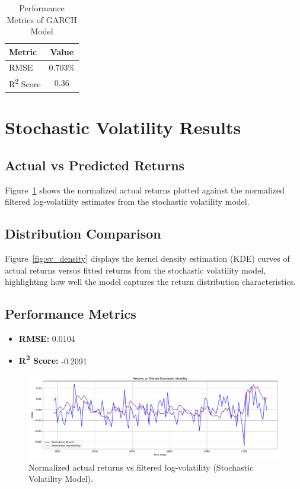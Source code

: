 \begin{table}[h!]
\centering
\caption{Performance Metrics of GARCH Model}
\label{tab:garch_performance}
\begin{tabular}{|l|c|}
\hline
\textbf{Metric}   & \textbf{Value}  \\ \hline
RMSE              & 0.703\%  \\ \hline
R\textsuperscript{2} Score & 0.36  \\ \hline
\end{tabular}
\end{table}

\newpage
\section{Stochastic Volatility Results}
\subsection{Actual vs Predicted Returns}
Figure~\ref{fig:sv_actual_vs_pred} shows the normalized actual returns plotted against the normalized filtered log-volatility estimates from the stochastic volatility model.

\subsection{Distribution Comparison}
Figure~\ref{fig:sv_density} displays the kernel density estimation (KDE) curves of actual returns versus fitted returns from the stochastic volatility model, highlighting how well the model captures the return distribution characteristics.

\subsection{Performance Metrics}
\begin{itemize}
    \item \textbf{RMSE:} 0.0104
    \item \textbf{R\textsuperscript{2} Score:} -0.2091
\end{itemize}

\begin{figure}[h!]
    \centering
    \includegraphics[width=\textwidth]{Images/stochastic_volatility.pdf}
    \caption{Normalized actual returns vs filtered log-volatility (Stochastic Volatility Model).}
    \label{fig:sv_actual_vs_pred}
\end{figure}

